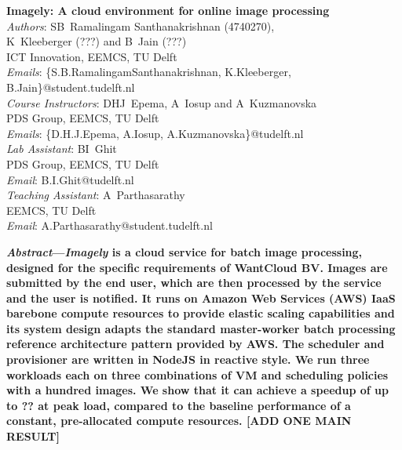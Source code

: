 \documentclass[a4paper]{IEEEtran}
\begin{document}
\setlength{\tabcolsep}{16pt}
\renewcommand{\arraystretch}{1.25}

\begin{center}
  \textbf{\Large{
    Imagely: A cloud environment for online image processing
  }}\\
  \vspace{0.25cm}
  \emph{Authors}: SB~Ramalingam Santhanakrishnan (4740270), \\ K~Kleeberger (???) and B~Jain (???)\\
  ICT Innovation, EEMCS, TU Delft\\
  \emph{Emails}: \{S.B.RamalingamSanthanakrishnan, K.Kleeberger, B.Jain\}@student.tudelft.nl\\
  \vspace{0.2cm}
  \emph{Course Instructors}: DHJ~Epema, A~Iosup and A~Kuzmanovska\\
  PDS Group, EEMCS, TU Delft\\
  \emph{Emails}: \{D.H.J.Epema, A.Iosup, A.Kuzmanovska\}@tudelft.nl\\
  \vspace{0.2cm}
  \emph{Lab Assistant}: BI~Ghit\\
  PDS Group, EEMCS, TU Delft\\
  \emph{Email}: B.I.Ghit@tudelft.nl\\
  \vspace{0.2cm}
  \emph{Teaching Assistant}: A~Parthasarathy\\
  EEMCS, TU Delft\\
  \emph{Email}: A.Parthasarathy@student.tudelft.nl\\
\end{center}

\vspace{0.2cm}

\textbf{
  \emph{Abstract}---\emph{Imagely} is a cloud service for batch image processing, designed for the specific requirements of WantCloud BV. Images are submitted by the end user, which are then processed by the service and the user is notified. It runs on Amazon Web Services (AWS) IaaS barebone compute resources to provide elastic scaling capabilities and its system design adapts the standard master-worker batch processing reference architecture pattern provided by AWS. The scheduler and provisioner are written in NodeJS in reactive style. We run three workloads each on three combinations of VM and scheduling policies with a hundred images. We show that it can achieve a speedup of up to ?? at peak load, compared to the baseline performance of a constant, pre-allocated compute resources. [ADD ONE MAIN RESULT]
}
\end{document}
